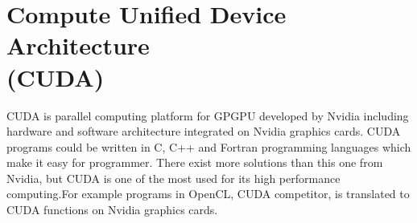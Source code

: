 \section[Compute Unified Device Architecture]{Compute Unified Device Architecture\\ (CUDA)}
CUDA is parallel computing platform for GPGPU developed by Nvidia including hardware and software architecture integrated on Nvidia graphics cards. CUDA programs could be written in C, C++ and Fortran programming languages which make it easy for programmer. There exist more solutions than this one from Nvidia, but CUDA is one of the most used for its high performance computing.For example programs in OpenCL, CUDA competitor, is translated to CUDA functions on Nvidia graphics cards.\\

